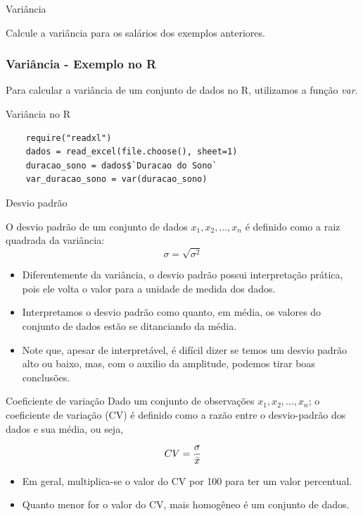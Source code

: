 \begin{frame}{Variância}
\begin{exemplo}
    Calcule a variância para os salários dos exemplos anteriores. 
\end{exemplo}    
\end{frame}

\begin{frame}[fragile]
    \frametitle{Variância - Exemplo no R}   
    Para calcular a variância de um conjunto de dados no R, utilizamos a função \textit{var}.
    \begin{block}{Variância no R}
    \begin{verbatim}
    require("readxl")
    dados = read_excel(file.choose(), sheet=1) 
    duracao_sono = dados$`Duracao do Sono`
    var_duracao_sono = var(duracao_sono)
    \end{verbatim}
    \end{block}
\end{frame}

\begin{frame}{Desvio padrão}

O desvio padrão de um conjunto de dados $x_1, x_2, \dots, x_n$ é definido como a raiz 
quadrada da variância:
\pause
$$\sigma =\sqrt{\sigma^2}$$
\pause

\begin{itemize}
    \item Diferentemente da variância, o desvio padrão possui interpretação prática, pois ele volta o valor para a unidade de medida dos dados.
    \pause
    \item Interpretamos o desvio padrão como quanto, em média, os valores do conjunto de dados estão se ditanciando da média. 
    \pause
    \item Note que, apesar de interpretável, é difícil dizer se temos um desvio padrão alto ou baixo, mas, com o auxilio da amplitude, podemos tirar boas conclusões. 
\end{itemize}
\end{frame}

\begin{frame}{Coeficiente de variação}
Dado um conjunto de observações $x_1, x_2, \dots, x_n$; o coeficiente de variação
(CV) é definido como a razão entre o desvio-padrão dos dados e sua média,
ou seja,

 $$CV = \dfrac{\sigma}{\Bar{x}}$$

 \begin{itemize}
    \item Em geral, multiplica-se o valor do CV por 100 para ter um valor percentual. 
    \pause
    \item Quanto menor for o valor do CV, mais homogêneo é um conjunto de dados.
 \end{itemize}
\end{frame}

